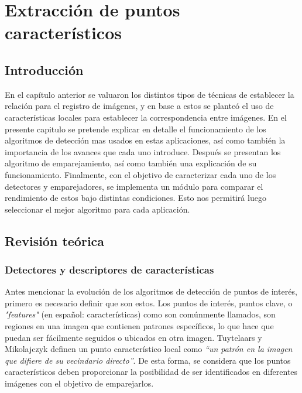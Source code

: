 \chapter{Extracción de puntos característicos}
\label{capitulo3}


\section{Introducción}

En el capítulo anterior se valuaron los distintos tipos de técnicas de establecer la relación para el registro de imágenes, y en base a estos se planteó el uso de características locales para establecer la correspondencia entre imágenes. En el presente capitulo se pretende explicar en detalle el funcionamiento de los algoritmos de detección mas usados en estas aplicaciones, así como también la importancia de los avances que cada uno introduce. Después se presentan los algoritmo de emparejamiento, así como también una explicación de su funcionamiento. Finalmente, con el objetivo de caracterizar cada uno de los detectores y emparejadores, se implementa un módulo para comparar el rendimiento de estos bajo distintas condiciones. Esto nos permitirá luego seleccionar el mejor algoritmo para cada aplicación.

\section{Revisión teórica}

\subsection{Detectores y descriptores de características}

Antes mencionar la evolución de los algoritmos de detección de puntos de interés, primero es necesario definir que son estos. Los puntos de interés, puntos clave, o \textit{"features"} (en español: características) como son comúnmente llamados, son regiones en una imagen que contienen patrones específicos, lo que hace que puedan ser fácilmente seguidos o ubicados en otra imagen. Tuytelaars y Mikolajczyk \cite{Tuytelaars} definen un punto característico local como \textit{``un patrón en la imagen que difiere de su vecindario directo''}. De esta forma, se considera que los puntos característicos deben proporcionar la posibilidad de ser identificados en diferentes imágenes con el objetivo de emparejarlos.

